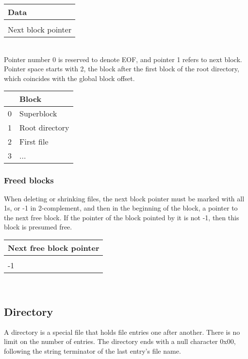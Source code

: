 \documentclass[]{article}
\begin{document}
	\begin{tabular}{|l|}
		\hline
		Data \\
		\hline
		[Padding] \\
		\hline
		Next block pointer \\
		\hline
	\end{tabular} \\

	Pointer number 0 is reserved to denote EOF, and pointer 1 refers to next block. Pointer space starts with 2, the block after the first block of the root directory, which coincides with the global block offset. \\

	\begin{tabular}{|l|l|}
		\hline
		 & \textbf{Block} \\ [0.5ex]
		\hline
		0 & Superblock \\
		\hline
		1 & Root directory \\
		\hline
		2 & First file \\
		\hline
		3 & ... \\
		\hline
	\end{tabular}

	\subsubsection{Freed blocks}

	When deleting or shrinking files, the next block pointer must be marked with all 1s, or -1 in 2-complement, and then in the beginning of the block, a pointer to the next free block. If the pointer of the block pointed by it is not -1, then this block is presumed free. \\

	\begin{tabular}{|l|}
		\hline
		Next free block pointer \\
		\hline
		[Padding] \\
		\hline
		-1 \\
		\hline
	\end{tabular} \\

	\subsection{Directory}

	A directory is a special file that holds file entries one after another. There is no limit on the number of entries. The directory ends with a null character 0x00, following the string terminator of the last entry's file name. \\
\end{document}
